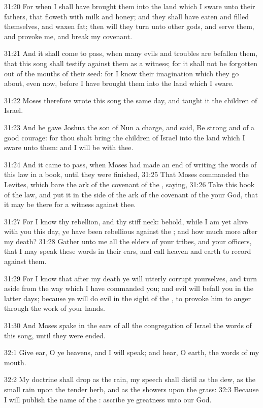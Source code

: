 31:20 For when I shall have brought them into the land which I sware
unto their fathers, that floweth with milk and honey; and they shall
have eaten and filled themselves, and waxen fat; then will they turn
unto other gods, and serve them, and provoke me, and break my
covenant.

31:21 And it shall come to pass, when many evils and troubles are
befallen them, that this song shall testify against them as a witness;
for it shall not be forgotten out of the mouths of their seed: for I
know their imagination which they go about, even now, before I have
brought them into the land which I sware.

31:22 Moses therefore wrote this song the same day, and taught it the
children of Israel.

31:23 And he gave Joshua the son of Nun a charge, and said, Be strong
and of a good courage: for thou shalt bring the children of Israel
into the land which I sware unto them: and I will be with thee.

31:24 And it came to pass, when Moses had made an end of writing the
words of this law in a book, until they were finished, 31:25 That
Moses commanded the Levites, which bare the ark of the covenant of the
\LORD, saying, 31:26 Take this book of the law, and put it in the side
of the ark of the covenant of the \LORD your God, that it may be there
for a witness against thee.

31:27 For I know thy rebellion, and thy stiff neck: behold, while I am
yet alive with you this day, ye have been rebellious against the \LORD;
and how much more after my death?  31:28 Gather unto me all the elders
of your tribes, and your officers, that I may speak these words in
their ears, and call heaven and earth to record against them.

31:29 For I know that after my death ye will utterly corrupt
yourselves, and turn aside from the way which I have commanded you;
and evil will befall you in the latter days; because ye will do evil
in the sight of the \LORD, to provoke him to anger through the work of
your hands.

31:30 And Moses spake in the ears of all the congregation of Israel
the words of this song, until they were ended.

32:1 Give ear, O ye heavens, and I will speak; and hear, O earth, the
words of my mouth.

32:2 My doctrine shall drop as the rain, my speech shall distil as the
dew, as the small rain upon the tender herb, and as the showers upon
the grass: 32:3 Because I will publish the name of the \LORD: ascribe
ye greatness unto our God.

